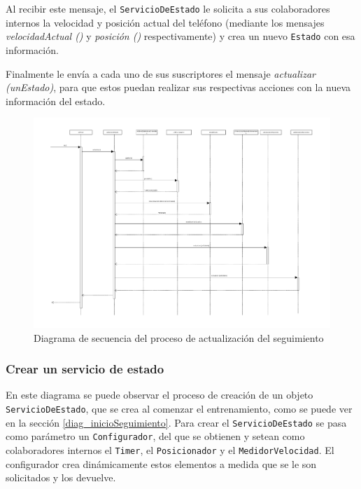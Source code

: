 Al recibir este mensaje, el \texttt{ServicioDeEstado} le solicita a sus colaboradores internos la velocidad y posición actual del teléfono (mediante los mensajes \emph{velocidadActual ()} y \emph{posición ()} respectivamente) y crea un nuevo \texttt{Estado} con esa información.


Finalmente le envía a cada uno de sus suscriptores el mensaje \emph{actualizar (unEstado)}, para que estos puedan realizar sus respectivas acciones con la nueva información del estado. 

\newpage

\begin{landscape}
	\begin{figure}[h]
		\includegraphics[scale=0.8]{images/actualizacionSeguimiento.pdf}
		\caption{Diagrama de secuencia del proceso de actualización del seguimiento}
	\end{figure} 
\end{landscape}

\newpage

\subsubsection{Crear un servicio de estado}\label{diag_crearUnServicioDeEstado}
En este diagrama se puede observar el proceso de creación de un objeto \texttt{ServicioDeEstado}, que se crea al comenzar el entrenamiento, como se puede ver en la sección \ref{diag_inicioSeguimiento}. Para crear el \texttt{ServicioDeEstado}
 se pasa como parámetro un \texttt{Configurador}, del que se obtienen y setean como colaboradores internos el \texttt{Timer}, el \texttt{Posicionador} y el \texttt{MedidorVelocidad}. El configurador crea dinámicamente estos elementos a medida que se le son solicitados y los devuelve.

